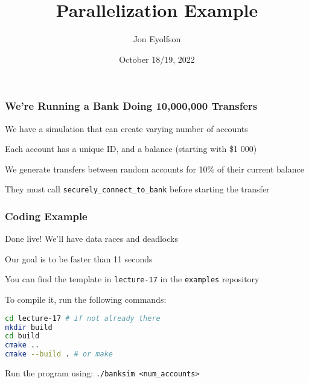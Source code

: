

\title{Parallelization Example}
\author{Jon Eyolfson}
\date{October 18/19, 2022}


  \begin{frame}
    \titlepage
  \end{frame}

  \begin{frame}
    \frametitle{We're Running a Bank Doing 10,000,000 Transfers}

    We have a simulation that can create varying number of accounts

    \vspace{2em}

    Each account has a unique ID, and a balance (starting with \$1 000)

    \vspace{2em}

    We generate transfers between random accounts for 10\% of their current
    balance

    \vspace{2em}

    They must call \lstinline!securely_connect_to_bank! before starting the
    transfer
  \end{frame}

  \begin{frame}[fragile]
    \frametitle{Coding Example}

    Done live! We'll have data races and deadlocks
    
    \vspace{2em}

    Our goal is to be faster than 11 seconds

    \vspace{2em}

    You can find the template in \texttt{lecture-17} in the \texttt{examples}
    repository

    \vspace{2em}

    To compile it, run the following commands:

    \begin{lstlisting}[language=bash, xleftmargin=2em]
cd lecture-17 # if not already there
mkdir build
cd build
cmake ..
cmake --build . # or make
    \end{lstlisting}

    \vspace{2em}

    Run the program using: \lstinline!./banksim <num_accounts>!
  \end{frame}

